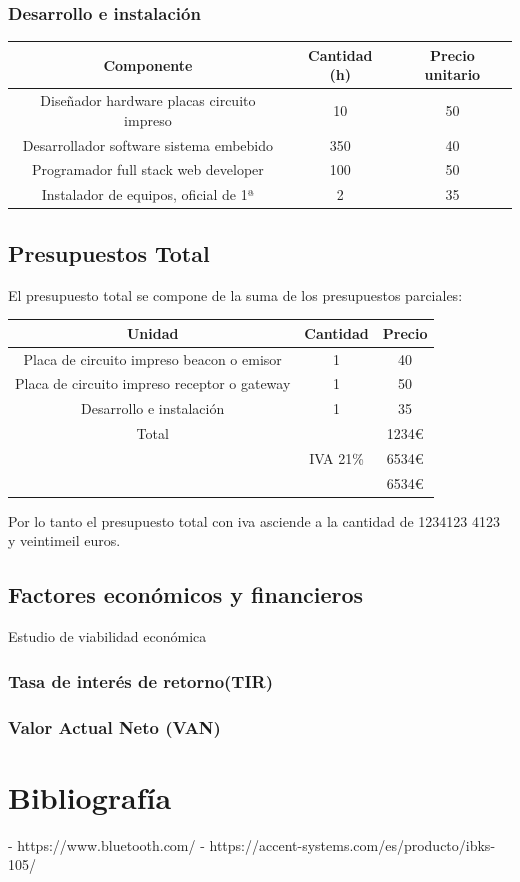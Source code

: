 \documentclass[a4paper ,12pt, onecolumn]{article}
\begin{document}
            \subsubsection{Desarrollo e instalación}
            \begin{center}
                \begin{tabular}{||c | c |c ||} 
                \hline
                Componente & Cantidad (h) & Precio unitario  \\ [0.5ex] 
                \hline\hline
                Diseñador hardware placas circuito impreso   & 10  & 50 \\ 
                Desarrollador  software sistema embebido     & 350 & 40 \\ 
                Programador full stack web developer         & 100 & 50 \\ 
                Instalador de equipos, oficial de 1ª         & 2   & 35 \\ 
                \hline
                \end{tabular}
            \end{center}
    \subsection{Presupuestos Total}
        El presupuesto total se compone de la suma de los presupuestos parciales:
        \begin{center}
            \begin{tabular}{||c | c |c ||} 
            \hline
            Unidad & Cantidad & Precio  \\ [0.5ex] 
            \hline\hline
            Placa de circuito impreso beacon o emisor & 1 & 40 \\ 
            Placa de circuito impreso receptor o gateway & 1 & 50 \\ 
            Desarrollo e instalación & 1 & 35 \\ 
            \hline
            \hline
            Total &  & 1234€ \\ 
             & IVA 21\%& 6534€ \\ 
             & & 6534€ \\ 
            \hline
            \end{tabular}
        \end{center}
        Por lo tanto el presupuesto total con iva asciende a la cantidad de 1234123 4123 y veintimeil euros.
    \subsection{Factores económicos y financieros}
    Estudio de viabilidad económica
        \subsubsection{Tasa de interés de retorno(TIR)}
        \subsubsection{Valor Actual Neto (VAN)}

\section{Bibliografía}
- https://www.bluetooth.com/
- https://accent-systems.com/es/producto/ibks-105/
\end{document}
